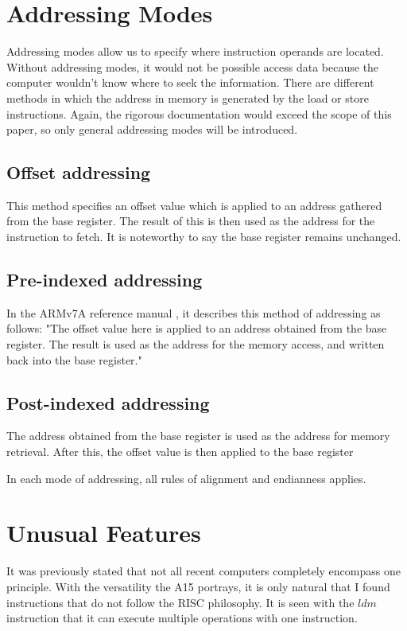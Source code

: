 \documentclass[12pt]{scrreprt}
\begin{document}
{\let\clearpage\relax\chapter{Addressing Modes}}

	Addressing modes allow us to specify where instruction operands are located.
	Without addressing modes, it would not be possible access data because the computer wouldn't know where to seek the information.
	There are different methods in which the address in memory is generated by the load or store instructions.
	Again, the rigorous documentation would exceed the scope of this paper, so only general addressing modes will be introduced.
	
	\section{Offset addressing}
		This method specifies an offset value which is applied to an address gathered from the base register.
		The result of this is then used as the address for the instruction to fetch.
		It is noteworthy to say the base register remains unchanged.

	\section{Pre-indexed addressing}
		In the ARMv7A reference manual \autocite{a7man}, it describes this method of addressing as follows:
		"The offset value here is applied to an address obtained from the base register.
		The result is used as the address for the memory access, and written back into the base register."

	\section{Post-indexed addressing}
		The address obtained from the base register is used as the address for memory retrieval.
		After this, the offset value is then applied to the base register

In each mode of addressing, all rules of alignment and endianness applies.

{\let\clearpage\relax\chapter{Unusual Features}}

	It was previously stated that not all recent computers completely encompass one principle.
	With the versatility the A15 portrays, it is only natural that I found instructions that do not follow the RISC philosophy.
	It is seen with the $ldm$ instruction that it can execute multiple operations with one instruction.
\end{document}
